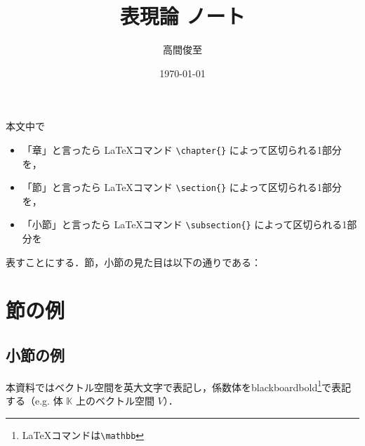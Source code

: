 \documentclass{ltjsreport}
\theoremstyle{mystyle} %
\numberwithin{equation}{section}
\begin{document}
\title{表現論 ノート}
\author{高間俊至}
\date{\today}
\maketitle

本文中で
\begin{itemize}
    \item 「章」と言ったら \LaTeX コマンド \texttt{\textbackslash chapter\{\}} によって区切られる1部分を，
    \item 「節」と言ったら \LaTeX コマンド \texttt{\textbackslash section\{\}} によって区切られる1部分を，
    \item 「小節」と言ったら \LaTeX コマンド \texttt{\textbackslash subsection\{\}} によって区切られる1部分を
\end{itemize}
表すことにする．節，小節の見た目は以下の通りである：

\section{節の例}
\subsection{小節の例}

本資料ではベクトル空間を英大文字で表記し，係数体をblackboardbold\footnote{\LaTeX コマンドは\texttt{\textbackslash mathbb}}で表記する（e.g. 体 $\mathbb{K}$ 上のベクトル空間 $V$）．

\setcounter{tocdepth}{2}
\tableofcontents





\appendix





\end{document}
